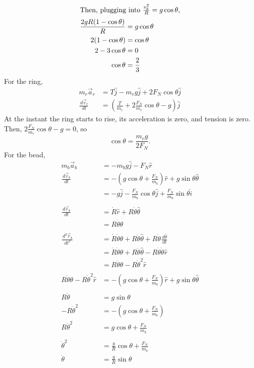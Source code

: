 \documentclass[solutions]{esg8012pset}
\renewcommand{\d}{\,d}
\begin{document}
\begin{enumerate}[a)]
\begin{align*}
     \intertext{Then, plugging into $\frac{v_b^2}{R} = g\cos\theta$,}
     \frac{2 g R(1 - \cos\theta)}{R} & = g\cos\theta \\
     2 (1 - \cos\theta) & = \cos\theta \\
     2 - 3\cos\theta & = 0 \\
     \cos\theta & = \frac{2}{3}
   \end{align*}
   For the ring,
   \begin{align*}
     m_r \vec a_r & = T\hat j - m_r g \hat j + 2 F_N\cos\theta \hat j \\
     \frac{\d \vec v_r}{\d t} & = \left(\frac{T}{m_r} + 2 \frac{F_N}{m_r}\cos\theta - g\right)\hat j
   \end{align*}
   At the instant the ring starts to rise, its acceleration is zero, and tension is zero.  Then, $2 \frac{F_N}{m_r}\cos\theta - g = 0$, so $$\cos\theta = \frac{m_r g}{2F_N}.$$
   For the bead,
   \begin{align*}
    m_b \vec a_b & = -m_b g\hat j -F_N\hat r \\
    \frac{\d \vec v_b}{\d t} & = -\left(g\cos\theta + \frac{F_N}{m_b}\right)\hat r + g\sin\theta\hat\theta  \\
    & = -g\hat j - \frac{F_N}{m_b}\cos\theta\hat j + \frac{F_N}{m_b}\sin\theta\hat i \\
    \\
    \frac{\d \vec r_b}{\d t} & = \dot R\hat r + R\dot\theta\hat\theta \\
     & = R\dot\theta\hat\theta \\
    \\
    \frac{\d^2 \vec r_b}{\d t^2} & = \dot R\dot\theta\hat \theta + R\ddot\theta\hat\theta + R\dot\theta \frac{\d\hat\theta}{\d t} \\
     & = \dot R\dot\theta\hat \theta + R\ddot\theta\hat\theta - R\dot\theta\dot\theta\hat r \\
     & = R\ddot\theta\hat\theta - R\dot\theta^2\hat r \\
    \\
    R\ddot\theta\hat\theta - R\dot\theta^2\hat r & = -\left(g\cos\theta + \frac{F_N}{m_b}\right)\hat r + g\sin\theta\hat\theta \\
    \\
    R\ddot\theta & = g\sin\theta \\
    -R\dot\theta^2 & = -\left(g\cos\theta + \frac{F_N}{m_b}\right) \\
    R\dot\theta^2 & = g\cos\theta + \frac{F_N}{m_b} \\
    \\
    \dot\theta^2 & = \frac{g}{R}\cos\theta + \frac{F_N}{m_b} \\
    \ddot\theta & = \frac{g}{R}\sin\theta
   \end{align*}


\end{enumerate}
\end{document}

